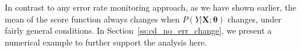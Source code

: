\documentclass[twoside,11pt]{article}
\begin{document}
In contrast to any error rate monitoring approach, as we have shown earlier, the mean of the score function always changes when $P(Y|\bm{X};\bm{\theta})$ changes, under fairly general conditions. In Section~\ref{ss:cd_no_err_change}, we present a numerical example to further support the analysis here.





 
\end{document}
